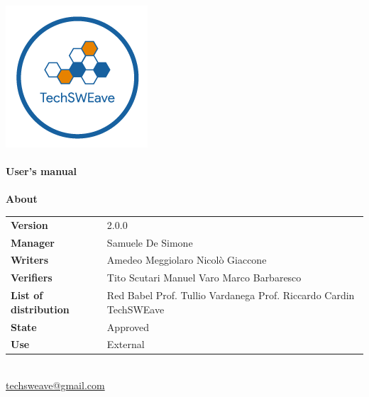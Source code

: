\documentclass[a4paper]{article}
\begin{document}
\begin{titlepage}
    \begin{center}
        \includegraphics{../../../../Images/logo.png}\\
        \vspace{20px}
        \textcolor{logo}{\hrulefill}\\
        \vspace{20px}
        \textbf{\huge\textcolor{logo}{User's manual}}\\
        \vspace{10px}
        \textcolor{logo}{\hrulefill}\\
        \vspace{40px}
        \textbf{\Large About}\\
        \vspace{20px}
        \begin{tabular}{p{100px} | p{100px}}
            \textbf{Version}              & 2.0.0                                                                                        \\
            \textbf{Manager}              & Samuele De Simone                                                                            \\
            \textbf{Writers}              & Amedeo Meggiolaro \newline Nicolò Giaccone                                                   \\
            \textbf{Verifiers}            & Tito Scutari \newline Manuel Varo  \newline Marco Barbaresco                                                          \\
            \textbf{List of distribution} & Red Babel \newline Prof. Tullio Vardanega \newline Prof. Riccardo Cardin \newline TechSWEave \\
            \textbf{State}                & Approved                                                                                     \\
            \textbf{Use}                  & External                                                                                     \\
        \end{tabular}\\
        \vspace{60px}
        \href{mailto:techsweave@gmail.com}{techsweave@gmail.com}\\


\end{center}
\end{titlepage}
\end{document}
